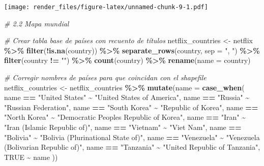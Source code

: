 \documentclass[
]{article}
\newenvironment{Shaded}{\begin{snugshade}}{\end{snugshade}}
\newcommand{\AttributeTok}[1]{\textcolor[rgb]{0.13,0.29,0.53}{#1}}
\newcommand{\CommentTok}[1]{\textcolor[rgb]{0.56,0.35,0.01}{\textit{#1}}}
\newcommand{\ConstantTok}[1]{\textcolor[rgb]{0.56,0.35,0.01}{#1}}
\newcommand{\FunctionTok}[1]{\textcolor[rgb]{0.13,0.29,0.53}{\textbf{#1}}}
\newcommand{\NormalTok}[1]{#1}
\newcommand{\OtherTok}[1]{\textcolor[rgb]{0.56,0.35,0.01}{#1}}
\newcommand{\SpecialCharTok}[1]{\textcolor[rgb]{0.81,0.36,0.00}{\textbf{#1}}}
\newcommand{\StringTok}[1]{\textcolor[rgb]{0.31,0.60,0.02}{#1}}
\begin{document}
\texttt{[image: render\_files/figure-latex/unnamed-chunk-9-1.pdf]}

\begin{Shaded}
\begin{Highlighting}[]
\CommentTok{\# 2.2 Mapa mundial}

\CommentTok{\# Crear tabla base de países con recuento de títulos}
\NormalTok{netflix\_countries }\OtherTok{\textless{}{-}}\NormalTok{ netflix }\SpecialCharTok{\%\textgreater{}\%}
  \FunctionTok{filter}\NormalTok{(}\SpecialCharTok{!}\FunctionTok{is.na}\NormalTok{(country)) }\SpecialCharTok{\%\textgreater{}\%}
  \FunctionTok{separate\_rows}\NormalTok{(country, }\AttributeTok{sep =} \StringTok{", "}\NormalTok{) }\SpecialCharTok{\%\textgreater{}\%}
  \FunctionTok{filter}\NormalTok{(country }\SpecialCharTok{!=} \StringTok{""}\NormalTok{) }\SpecialCharTok{\%\textgreater{}\%}
  \FunctionTok{count}\NormalTok{(country) }\SpecialCharTok{\%\textgreater{}\%}
  \FunctionTok{rename}\NormalTok{(}\AttributeTok{name =}\NormalTok{ country)}

\CommentTok{\# Corregir nombres de países para que coincidan con el shapefile}
\NormalTok{netflix\_countries }\OtherTok{\textless{}{-}}\NormalTok{ netflix\_countries }\SpecialCharTok{\%\textgreater{}\%}
  \FunctionTok{mutate}\NormalTok{(}\AttributeTok{name =} \FunctionTok{case\_when}\NormalTok{(}
\NormalTok{    name }\SpecialCharTok{==} \StringTok{"United States"} \SpecialCharTok{\textasciitilde{}} \StringTok{"United States of America"}\NormalTok{,}
\NormalTok{    name }\SpecialCharTok{==} \StringTok{"Russia"} \SpecialCharTok{\textasciitilde{}} \StringTok{"Russian Federation"}\NormalTok{,}
\NormalTok{    name }\SpecialCharTok{==} \StringTok{"South Korea"} \SpecialCharTok{\textasciitilde{}} \StringTok{"Republic of Korea"}\NormalTok{,}
\NormalTok{    name }\SpecialCharTok{==} \StringTok{"North Korea"} \SpecialCharTok{\textasciitilde{}} \StringTok{"Democratic People\textquotesingle{}s Republic of Korea"}\NormalTok{,}
\NormalTok{    name }\SpecialCharTok{==} \StringTok{"Iran"} \SpecialCharTok{\textasciitilde{}} \StringTok{"Iran (Islamic Republic of)"}\NormalTok{,}
\NormalTok{    name }\SpecialCharTok{==} \StringTok{"Vietnam"} \SpecialCharTok{\textasciitilde{}} \StringTok{"Viet Nam"}\NormalTok{,}
\NormalTok{    name }\SpecialCharTok{==} \StringTok{"Bolivia"} \SpecialCharTok{\textasciitilde{}} \StringTok{"Bolivia (Plurinational State of)"}\NormalTok{,}
\NormalTok{    name }\SpecialCharTok{==} \StringTok{"Venezuela"} \SpecialCharTok{\textasciitilde{}} \StringTok{"Venezuela (Bolivarian Republic of)"}\NormalTok{,}
\NormalTok{    name }\SpecialCharTok{==} \StringTok{"Tanzania"} \SpecialCharTok{\textasciitilde{}} \StringTok{"United Republic of Tanzania"}\NormalTok{,}
    \ConstantTok{TRUE} \SpecialCharTok{\textasciitilde{}}\NormalTok{ name}
\NormalTok{  ))}


\end{Highlighting}
\end{Shaded}
\end{document}
